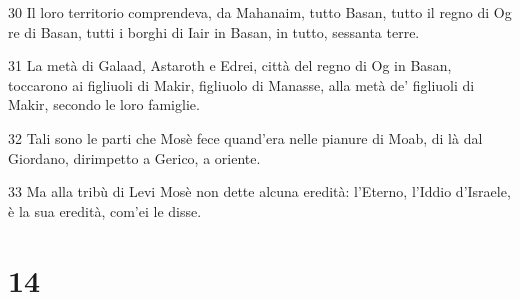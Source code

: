 \par 30 Il loro territorio comprendeva, da Mahanaim, tutto Basan, tutto il regno di Og re di Basan, tutti i borghi di Iair in Basan, in tutto, sessanta terre.
\par 31 La metà di Galaad, Astaroth e Edrei, città del regno di Og in Basan, toccarono ai figliuoli di Makir, figliuolo di Manasse, alla metà de' figliuoli di Makir, secondo le loro famiglie.
\par 32 Tali sono le parti che Mosè fece quand'era nelle pianure di Moab, di là dal Giordano, dirimpetto a Gerico, a oriente.
\par 33 Ma alla tribù di Levi Mosè non dette alcuna eredità: l'Eterno, l'Iddio d'Israele, è la sua eredità, com'ei le disse.

\chapter{14}

